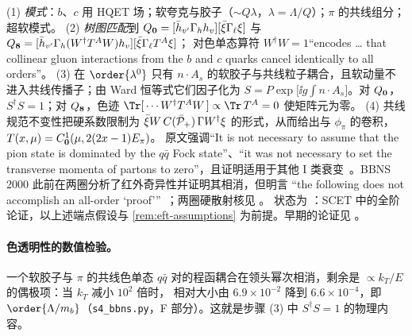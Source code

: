 \begin{proofsketch}
(1) \emph{模式}：$b$、$c$ 用 HQET 场；软夸克与胶子（$\sim Q\lambda$，$\lambda=\Lambda/Q$）；$\pi$ 的共线组分；超软模式。
(2) \emph{树图匹配}到 $Q_{\bf0}=[\bar h_{v'}\Gamma_hh_v][\bar\xi\Gamma_\ell\xi]$ 与 $Q_{\bf8}=[\bar h_{v'}\Gamma_h(W^\dagger T^AW)h_v][\bar\xi\Gamma_\ell T^A\xi]$；
对色单态算符 $W^\dagger W=1$“encodes … that collinear gluon interactions from the $b$ and $c$ quarks cancel identically to all orders”。
(3) 在 $\order{\lambda^0}$ 只有 $n\cdot A_s$ 的软胶子与共线粒子耦合，且软动量不进入共线传播子；由 Ward 恒等式它们因子化为
$S=P\exp\big[\ii g\int n\cdot A_s\big]$。对 $Q_{\bf0}$，$S^\dagger S=1$；对 $Q_{\bf8}$，色迹 $\Tr[\,\cdots W^\dagger T^AW\,]\propto\Tr\,T^A=0$ 使矩阵元为零。
(4) 共线规范不变性把硬系数限制为 $\bar\xi W\,C(\bar{\mathcal P}_+)\,\Gamma W^\dagger\xi$ 的形式，从而给出与 $\phi_\pi$ 的卷积，$T(x,\mu)=C^1_{\bf0}(\mu,2(2x-1)E_\pi)$。
原文强调“It is not necessary to assume that the pion state is dominated by the $q\bar q$ Fock state”、“it was not necessary to set the transverse momenta
of partons to zero”，且证明适用于其他 I 类衰变~\cite{BauerPirjolStewart2001}。BBNS 2000 此前在两圈分析了红外奇异性并证明其相消，但明言
“the following does not accomplish an all-order `proof'”~\cite{BenekeEtAl2000}；两圈硬散射核见 \cite{HuberKranklLi2016}。
状态为 \tagA：SCET 中的全阶论证，以上述端点假设与 \cref{rem:eft-assumptions} 为前提。早期的论证见 \cite{Bjorken1989,DuganGrinstein1991,PolitzerWise1991}。
\end{proofsketch}

\paragraph{色透明性的数值检验。}
一个软胶子与 $\pi$ 的共线色单态 $q\bar q$ 对的程函耦合在领头幂次相消，剩余是 $\propto k_T/E$ 的偶极项：当 $k_T$ 减小 $10^2$ 倍时，
相对大小由 $6.9\times10^{-2}$ 降到 $6.6\times10^{-4}$，即 $\order{\Lambda/m_b}$（\texttt{s4\_\allowbreak bbns.py}，F 部分）。这就是步骤 (3) 中 $S^\dagger S=1$ 的物理内容。

